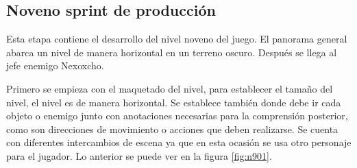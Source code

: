 
\subsection{Noveno sprint de producción}

Esta etapa contiene el desarrollo del nivel noveno del juego. El panorama general abarca un nivel de manera horizontal en un terreno oscuro. Después se llega al jefe enemigo Nexoxcho.

Primero se empieza con el maquetado del nivel, para establecer el tamaño del nivel, el nivel es de manera horizontal. Se establece también donde debe ir cada objeto o enemigo junto con anotaciones necesarias para la comprensión posterior, como son direcciones de movimiento o acciones que deben realizarse. Se cuenta con diferentes intercambios de escena ya que en esta ocasión se usa otro personaje para el jugador. Lo anterior se puede ver en la figura \ref{fig:n901}.

